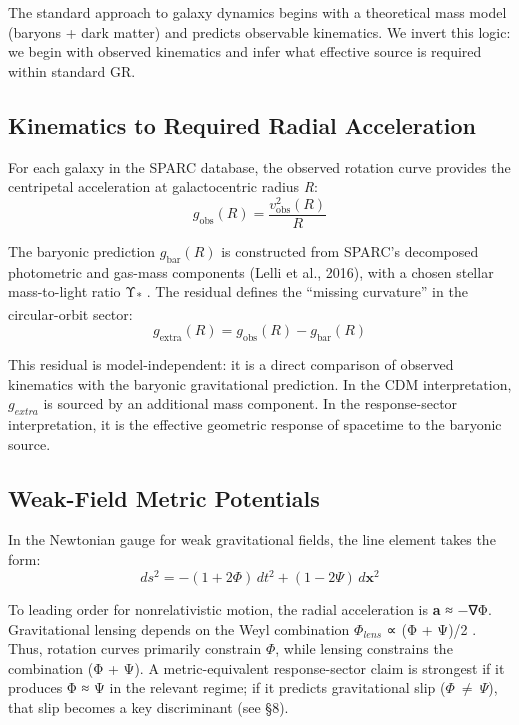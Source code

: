 \documentclass[11pt]{article}
\begin{document}
The standard approach to galaxy dynamics begins with a theoretical mass model (baryons + dark matter) and predicts observable kinematics. We invert this logic: we begin with observed kinematics and infer what effective source is required within standard GR.

\subsection{Kinematics to Required Radial Acceleration}\label{kinematics-to-required-radial-acceleration}

For each galaxy in the SPARC database, the observed rotation curve provides the centripetal acceleration at galactocentric radius \emph{R}:
\begin{equation*}
g_{\text{obs}}(R) = \frac{v_{\text{obs}}^{2}(R)}{R}
\end{equation*}

The baryonic prediction \(g_{\text{bar}}(R)\) is constructed from SPARC's decomposed photometric and gas-mass components (Lelli et al., 2016), with a chosen stellar mass-to-light ratio Υ\textsubscript{*} \citep{McGaugh2014, Rubin1970, Bosma1978}. The residual defines the ``missing curvature'' in the circular-orbit sector:
\begin{equation}
g_{\text{extra}}(R) = g_{\text{obs}}(R) - g_{\text{bar}}(R)
\label{eq:residual-acceleration}
\end{equation}

This residual is model-independent: it is a direct comparison of observed kinematics with the baryonic gravitational prediction. In the CDM interpretation, \(g_{extra}\) is sourced by an additional mass component. In the response-sector interpretation, it is the effective geometric response of spacetime to the baryonic source.

\subsection{Weak-Field Metric Potentials}\label{weak-field-metric-potentials}

In the Newtonian gauge for weak gravitational fields, the line element takes the form:
\begin{equation*}
ds^{2} = -(1 + 2\Phi)\, dt^{2} + (1 - 2\Psi)\, d\mathbf{x}^{2}
\end{equation*}

To leading order for nonrelativistic motion, the radial acceleration is \textbf{a} ≈ −∇Φ. Gravitational lensing depends on the Weyl combination \(\Phi_{lens}\) ∝ (Φ + Ψ)/2 \citep{PoissonWill2014}. Thus, rotation curves primarily constrain \(\Phi\), while lensing constrains the combination (Φ + Ψ). A metric-equivalent response-sector claim is strongest if it produces Φ ≈ Ψ in the relevant regime; if it predicts gravitational slip (\(\Phi\  \neq \ \Psi\)), that slip becomes a key discriminant (see §8).
\end{document}
